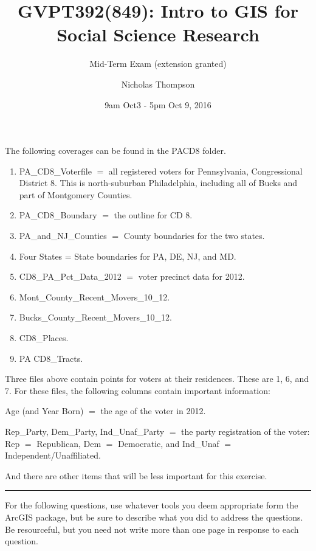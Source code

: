 \documentclass[]{article}
\title{GVPT392(849): Intro to GIS for Social Science Research}
\subtitle{Mid-Term Exam (extension granted)}
\author{Nicholas Thompson}
\date{9am Oct3 - 5pm Oct 9, 2016}
\begin{document}
\maketitle

The following coverages can be found in the PACD8 folder.

\begin{enumerate}
\def\labelenumi{\arabic{enumi}.}
\item
  PA\_CD8\_Voterfile \(=\) all registered voters for Pennsylvania,
  Congressional District 8. This is north-suburban Philadelphia,
  including all of Bucks and part of Montgomery Counties.
\item
  PA\_CD8\_Boundary \(=\) the outline for CD 8.
\item
  PA\_and\_NJ\_Counties \(=\) County boundaries for the two states.
\item
  Four States = State boundaries for PA, DE, NJ, and MD.
\item
  CD8\_PA\_Pct\_Data\_2012 \(=\) voter precinct data for 2012.
\item
  Mont\_County\_Recent\_Movers\_10\_12.
\item
  Bucks\_County\_Recent\_Movers\_10\_12.
\item
  CD8\_Places.
\item
  PA CD8\_Tracts.
\end{enumerate}

Three files above contain points for voters at their residences. These
are 1, 6, and 7. For these files, the following columns contain
important information:

Age (and Year Born) \(=\) the age of the voter in 2012.

Rep\_Party, Dem\_Party, Ind\_Unaf\_Party \(=\) the party registration of
the voter: Rep \(=\) Republican, Dem \(=\) Democratic, and Ind\_Unaf
\(=\) Independent/Unaffiliated.

And there are other items that will be less important for this exercise.

\begin{center}\rule{0.5\linewidth}{\linethickness}\end{center}

For the following questions, use whatever tools you deem appropriate
form the ArcGIS package, but be sure to describe what you did to address
the questions. Be resourceful, but you need not write more than one page
in response to each question.

\clearpage
\end{document}
